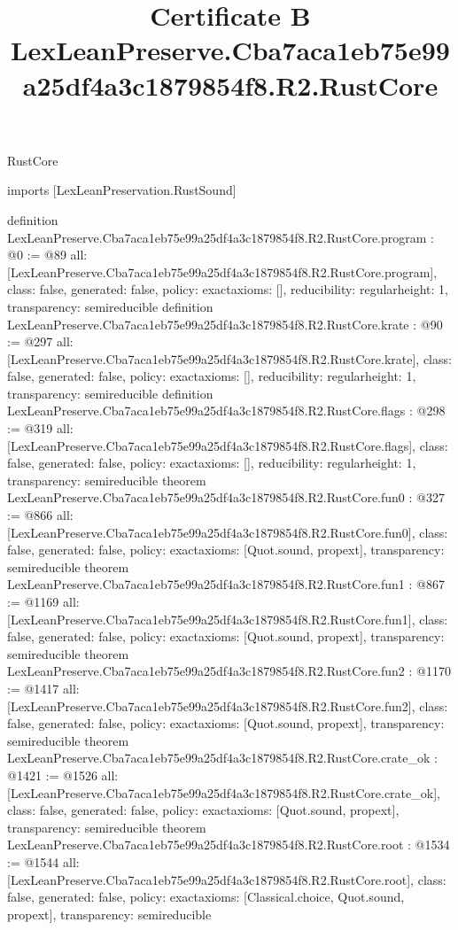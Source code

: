 \begin{lexlean}{RustCore}
\title{Certificate B LexLeanPreserve.Cba7aca1eb75e99a25df4a3c1879854f8.R2.RustCore}
\begin{coremodule}
imports [LexLeanPreservation.RustSound]

definition LexLeanPreserve.Cba7aca1eb75e99a25df4a3c1879854f8.R2.RustCore.program : @0 := @89 {
  all: [LexLeanPreserve.Cba7aca1eb75e99a25df4a3c1879854f8.R2.RustCore.program],
  class: false,
  generated: false,
  policy: exact{axioms: []},
  reducibility: regular{height: 1},
  transparency: semireducible
}
definition LexLeanPreserve.Cba7aca1eb75e99a25df4a3c1879854f8.R2.RustCore.krate : @90 := @297 {
  all: [LexLeanPreserve.Cba7aca1eb75e99a25df4a3c1879854f8.R2.RustCore.krate],
  class: false,
  generated: false,
  policy: exact{axioms: []},
  reducibility: regular{height: 1},
  transparency: semireducible
}
definition LexLeanPreserve.Cba7aca1eb75e99a25df4a3c1879854f8.R2.RustCore.flags : @298 := @319 {
  all: [LexLeanPreserve.Cba7aca1eb75e99a25df4a3c1879854f8.R2.RustCore.flags],
  class: false,
  generated: false,
  policy: exact{axioms: []},
  reducibility: regular{height: 1},
  transparency: semireducible
}
theorem LexLeanPreserve.Cba7aca1eb75e99a25df4a3c1879854f8.R2.RustCore.fun0 : @327 := @866 {
  all: [LexLeanPreserve.Cba7aca1eb75e99a25df4a3c1879854f8.R2.RustCore.fun0],
  class: false,
  generated: false,
  policy: exact{axioms: [Quot.sound, propext]},
  transparency: semireducible
}
theorem LexLeanPreserve.Cba7aca1eb75e99a25df4a3c1879854f8.R2.RustCore.fun1 : @867 := @1169 {
  all: [LexLeanPreserve.Cba7aca1eb75e99a25df4a3c1879854f8.R2.RustCore.fun1],
  class: false,
  generated: false,
  policy: exact{axioms: [Quot.sound, propext]},
  transparency: semireducible
}
theorem LexLeanPreserve.Cba7aca1eb75e99a25df4a3c1879854f8.R2.RustCore.fun2 : @1170 := @1417 {
  all: [LexLeanPreserve.Cba7aca1eb75e99a25df4a3c1879854f8.R2.RustCore.fun2],
  class: false,
  generated: false,
  policy: exact{axioms: [Quot.sound, propext]},
  transparency: semireducible
}
theorem LexLeanPreserve.Cba7aca1eb75e99a25df4a3c1879854f8.R2.RustCore.crate_ok : @1421 := @1526 {
  all: [LexLeanPreserve.Cba7aca1eb75e99a25df4a3c1879854f8.R2.RustCore.crate_ok],
  class: false,
  generated: false,
  policy: exact{axioms: [Quot.sound, propext]},
  transparency: semireducible
}
theorem LexLeanPreserve.Cba7aca1eb75e99a25df4a3c1879854f8.R2.RustCore.root : @1534 := @1544 {
  all: [LexLeanPreserve.Cba7aca1eb75e99a25df4a3c1879854f8.R2.RustCore.root],
  class: false,
  generated: false,
  policy: exact{axioms: [Classical.choice, Quot.sound, propext]},
  transparency: semireducible
}


\end{coremodule}
\end{lexlean}
